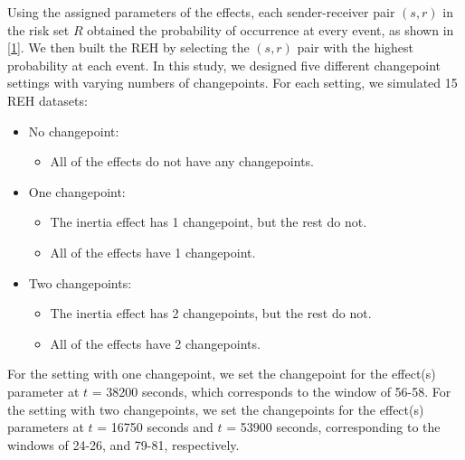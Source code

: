 \documentclass[]{interact}
\theoremstyle{plain}%
\theoremstyle{definition}
\theoremstyle{remark}
\begin{document}
{	Using the assigned parameters of the effects, each sender-receiver pair $(s,r)$ in the risk set $R$ obtained the probability of occurrence at every event, as shown in \autoref{1}. We then built the REH by selecting the $(s,r)$ pair with the highest probability at each event. In this study, we designed five different changepoint settings with varying numbers of changepoints. For each setting, we simulated 15 REH datasets:
	
    \begin{itemize}
    	\item No changepoint:
    	\begin{itemize}
    		\item All of the effects do not have any changepoints. \\
    	\end{itemize}
    	\item One changepoint:
    	\begin{itemize}
    		\item The inertia effect has 1 changepoint, but the rest do not.
    		\item All of the effects have 1 changepoint. \\
    	\end{itemize}
    	\item Two changepoints:
    	\begin{itemize}
    		\item The inertia effect has 2 changepoints, but the rest do not.
    		\item All of the effects have 2 changepoints.
    	\end{itemize}
    \end{itemize}

    For the setting with one changepoint, we set the changepoint for the effect(s) parameter at $t$ = 38200 seconds, which corresponds to the window of 56-58. For the setting with two changepoints, we set the changepoints for the effect(s) parameters at $t$ = 16750 seconds and $t$ = 53900 seconds, corresponding to the windows of 24-26, and 79-81, respectively.

}
\end{document}
